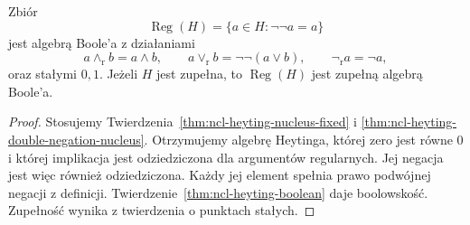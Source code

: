 \begin{twierdzenie}
\label{thm:ncl-heyting-regular-boolean}
Zbiór
\[
 \operatorname{Reg}(H)=\{a\in H:\neg\neg a=a\}
\]
jest algebrą Boole'a z działaniami
\[
 a\wedge_{\mathrm r}b=a\wedge b,\qquad
 a\vee_{\mathrm r}b=\neg\neg(a\vee b),\qquad
 \neg_{\mathrm r}a=\neg a,
\]
oraz stałymi $0,1$.
Jeżeli $H$ jest zupełna, to
$\operatorname{Reg}(H)$ jest zupełną algebrą Boole'a.
\end{twierdzenie}
\begin{proof}
Stosujemy Twierdzenia~\ref{thm:ncl-heyting-nucleus-fixed}
i \ref{thm:ncl-heyting-double-negation-nucleus}.
Otrzymujemy algebrę Heytinga, której zero
jest równe $0$ i której implikacja jest
odziedziczona dla argumentów regularnych.
Jej negacja jest więc również odziedziczona.
Każdy jej element spełnia prawo podwójnej negacji
z definicji. Twierdzenie~\ref{thm:ncl-heyting-boolean}
daje boolowskość.
Zupełność wynika z twierdzenia o punktach stałych.
\end{proof}

